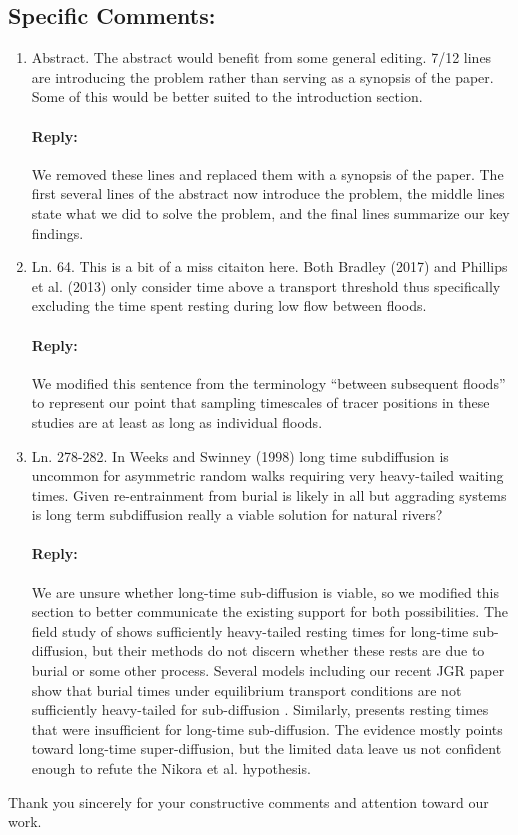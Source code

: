 \documentclass[11pt]{article}
\begin{document}
\subsection*{Specific Comments:}
\begin{enumerate}
\item Abstract. The abstract would benefit from some general editing. 7/12 lines are introducing the problem rather than serving as a synopsis of the paper. Some of this would be better suited to the introduction section.
\paragraph{Reply:} We removed these lines and replaced them with a synopsis of the paper. The first several lines of the abstract now introduce the problem, the middle lines state what we did to solve the problem, and the final lines summarize our key findings. 

\item Ln. 64. This is a bit of a miss citaiton here. Both Bradley (2017) and Phillips et al. (2013) only consider time above a transport threshold thus specifically excluding the time spent resting during low flow between floods.
\paragraph{Reply:} We modified this sentence from the terminology ``between subsequent floods'' to represent our point that sampling timescales of tracer positions in these studies are at least as long as individual floods.

\item Ln. 278-282. In Weeks and Swinney (1998) long time subdiffusion is uncommon for asymmetric random walks requiring very heavy-tailed waiting times. Given re-entrainment from burial is likely in all but aggrading systems is long term subdiffusion really a viable solution for natural rivers?
\paragraph{Reply:} We are unsure whether long-time sub-diffusion is viable, so we modified this section to better communicate the existing support for both possibilities. The field study of  \citet{Olinde2015} shows sufficiently heavy-tailed resting times for long-time sub-diffusion, but their methods do not discern whether these rests are due to burial or some other process. Several models including our recent JGR paper show that burial times under equilibrium transport conditions are not sufficiently heavy-tailed for sub-diffusion \citep{Pierce2020,Martin2014,Voepel2013}. Similarly, \citet{Bradley2017} presents resting times that were insufficient for long-time sub-diffusion. The evidence mostly points toward long-time super-diffusion, but the limited data leave us not confident enough to refute the Nikora et al. hypothesis.
\end{enumerate}

Thank you sincerely for your constructive comments and attention toward our work. 


\end{document}
